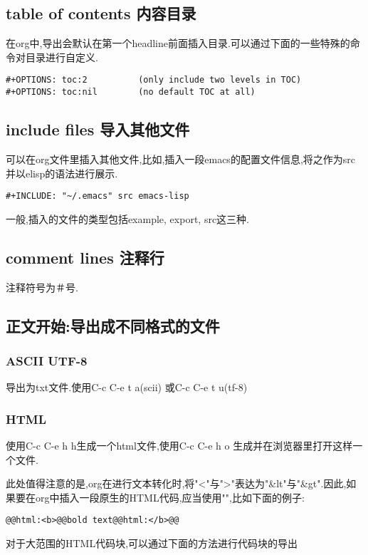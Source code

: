 \documentclass[10pt,a4paper]{article}
\begin{document}
\subsection{table of contents 内容目录}
\label{sec:org90bdb5f}
在org中,导出会默认在第一个headline前面插入目录.可以通过下面的一些特殊的命令对目录进行自定义.

\begin{verbatim}
#+OPTIONS: toc:2          (only include two levels in TOC)
#+OPTIONS: toc:nil        (no default TOC at all)
\end{verbatim}

\subsection{include files 导入其他文件}
\label{sec:org44c9e7d}
可以在org文件里插入其他文件,比如,插入一段emacs的配置文件信息,将之作为src并以elisp的语法进行展示.
\begin{verbatim}
#+INCLUDE: "~/.emacs" src emacs-lisp
\end{verbatim}
一般,插入的文件的类型包括example, export, src这三种.

\subsection{comment lines 注释行}
\label{sec:org334183c}
注释符号为＃号.

\subsection{正文开始:导出成不同格式的文件}
\label{sec:orge7e7789}

\subsubsection{ASCII UTF-8}
\label{sec:org8473597}
导出为txt文件.使用C-c C-e t a(scii) 或C-c C-e t u(tf-8) 

\subsubsection{HTML}
\label{sec:orgc53b1ec}
使用C-c C-e h h生成一个html文件,使用C-c C-e h o 生成并在浏览器里打开这样一个文件.

此处值得注意的是,org在进行文本转化时,将"<"与">"表达为"\&lt"与"\&gt".因此,如果要在org中插入一段原生的HTML代码,应当使用"",比如下面的例子:

\begin{verbatim}
@@html:<b>@@bold text@@html:</b>@@
\end{verbatim}
对于大范围的HTML代码块,可以通过下面的方法进行代码块的导出
\end{document}
